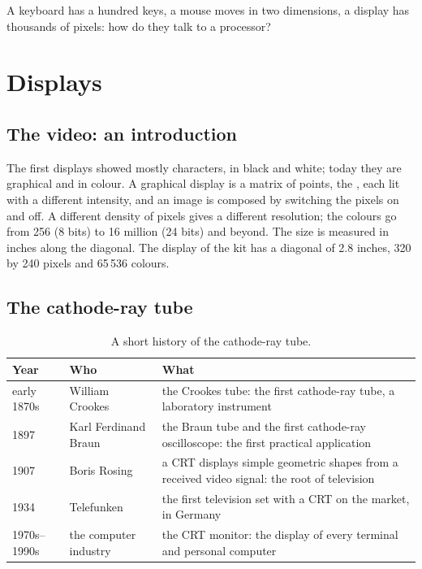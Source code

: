 A keyboard has a hundred keys, a mouse moves in two dimensions, a display has
thousands of pixels: how do they talk to a processor?

\section{Displays}

\subsection{The video: an introduction}

The first displays showed mostly characters, in black and white; today they
are graphical and in colour. A graphical display is a matrix of points, the
, each lit with a different intensity, and an image is composed
by switching the pixels on and off. A different density of pixels gives a
different resolution; the colours go from 256 (8 bits) to 16 million (24
bits) and beyond. The size is measured in inches along the diagonal. The
display of the \prg kit has a diagonal of 2.8 inches, 320 by 240 pixels and
65\,536 colours.

\subsection{The cathode-ray tube}

\begin{table}[htb]
\centering\small
\caption{A short history of the cathode-ray tube.}\label{tab:io:crt}
\begin{tabularx}{\textwidth}{@{}llL@{}}
\toprule
\textbf{Year} & \textbf{Who} & \textbf{What}\\
\midrule
early 1870s & William Crookes & the Crookes tube: the first cathode-ray tube, a laboratory instrument\\
1897 & Karl Ferdinand Braun & the Braun tube and the first cathode-ray oscilloscope: the first practical application\\
1907 & Boris Rosing & a CRT displays simple geometric shapes from a received video signal: the root of television\\
1934 & Telefunken & the first television set with a CRT on the market, in Germany\\
1970s--1990s & the computer industry & the CRT monitor: the display of every terminal and personal computer\\
\bottomrule
\end{tabularx}
\end{table}

